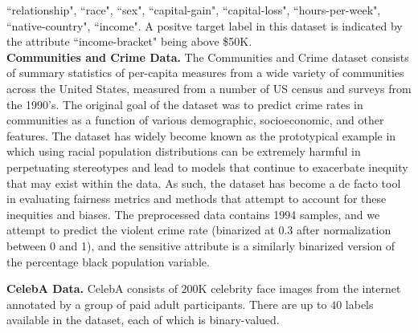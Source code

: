                           ``relationship", ``race", ``sex", ``capital-gain",
                           ``capital-loss", ``hours-per-week", ``native-country",
                           ``income". A positve target label in this dataset is indicated by the attribute ``income-bracket" being above \$50K.\\
{\bf Communities and Crime Data.}
The Communities and Crime dataset consists of summary statistics of per-capita measures from a wide variety of communities across the United States, measured from a number of US census and surveys from the 1990's. The original goal of the dataset was to predict crime rates in communities as a function of various demographic, socioeconomic, and other features. The dataset has widely become known as the prototypical example in which using racial population distributions can be extremely harmful in perpetuating stereotypes and lead to models that continue to exacerbate inequity that may exist within the data.
As such, the dataset has become a de facto tool in evaluating fairness metrics and methods that attempt to account for these inequities and biases. The preprocessed data contains 1994 samples, and we attempt to predict the violent crime rate (binarized at 0.3 after normalization between 0 and 1), and the sensitive attribute is a similarly binarized version of the percentage black population variable.

{\bf CelebA Data.}
CelebA \citep{liu2015faceattributes} consists of $200$K celebrity face images from the internet annotated by a group of paid adult participants. There are up to $40$ labels available in the dataset, each of which is binary-valued.